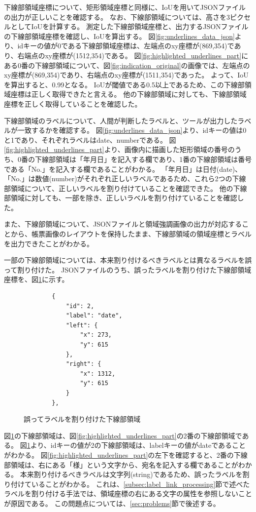 下線部領域座標について、矩形領域座標と同様に、IoUを用いてJSONファイルの出力が正しいことを確認する。
なお、下線部領域については、高さを3ピクセルとしてIoUを計算する。
測定した下線部領域座標と、出力するJSONファイルの下線部領域座標を確認し、IoUを算出する。
図\ref{fig:underlines_data_json}より、idキーの値が0である下線部領域座標は、左端点のxy座標が(869,354)であり、右端点のxy座標が(1512,354)である。
図\ref{fig:highlighted_underlines_part}にある0番の下線部領域について、図\ref{fig:indication_original}の画像では、左端点のxy座標が(869,354)であり、右端点のxy座標が(1511,354)であった。
よって、IoUを算出すると、0.99となる。
IoUが閾値である0.5以上であるため、この下線部領域座標は正しく取得できたと言える。
他の下線部領域に対しても、下線部領域座標を正しく取得していることを確認した。

下線部領域のラベルについて、人間が判断したラベルと、ツールが出力したラベルが一致するかを確認する。
図\ref{fig:underlines_data_json}より、idキーの値は0と1であり、それぞれラベルはdate、numberである。
図\ref{fig:highlighted_underlines_part}より、画像内に描画した矩形領域の番号のうち、0番の下線部領域は「年月日」を記入する欄であり、1番の下線部領域は番号である「No.」を記入する欄であることがわかる。
「年月日」は日付(date)、「No.」は数値(number)がそれぞれ正しいラベルであるため、これら2つの下線部領域について、正しいラベルを割り付けていることを確認できた。
他の下線部領域に対しても、一部を除き、正しいラベルを割り付けていることを確認した。

また、下線部領域について、JSONファイルと領域強調画像の出力が対応することから、帳票画像のレイアウトを保持したまま、下線部領域の領域座標とラベルを出力できたことがわかる。

一部の下線部領域については、本来割り付けるべきラベルとは異なるラベルを誤って割り付けた。
JSONファイルのうち、誤ったラベルを割り付けた下線部領域座標を、図\ref{fig:underlines_data_miss_json}に示す。

\lstset{language=}
\begin{figure}[tp]
    \begin{lstlisting}
        {
            "id": 2,
            "label": "date",
            "left": {
                "x": 273,
                "y": 615
            },
            "right": {
                "x": 1312,
                "y": 615
            }
        },
    \end{lstlisting}
    \caption{誤ってラベルを割り付けた下線部領域}\label{fig:underlines_data_miss_json}
\end{figure}

図\ref{fig:underlines_data_miss_json}の下線部領域は、図\ref{fig:highlighted_underlines_part}の2番の下線部領域である。
図\ref{fig:underlines_data_miss_json}より、idキーの値が2の下線部領域は、labelキーの値がdateであることがわかる。
図\ref{fig:highlighted_underlines_part}の左下を確認すると、2番の下線部領域は、右にある「様」という文字から、宛名を記入する欄であることがわかる。
本来割り付けるべきラベルは文字列(string)であるため、誤ったラベルを割り付けていることがわかる。
これは、\ref{subsec:label_link_processing}節で述べたラベルを割り付ける手法では、領域座標の右にある文字の属性を参照しないことが原因である。
この問題点については、\ref{sec:problems}節で後述する。